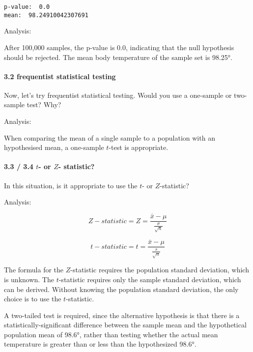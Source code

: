 \documentclass[11pt]{article}
\begin{document}
    \begin{Verbatim}[commandchars=\\\{\}]
p-value:  0.0
mean:  98.24910042307691

    \end{Verbatim}

    Analysis:

After 100,000 samples, the p-value is 0.0, indicating that the null
hypothesis should be rejected. The mean body temperature of the sample
set is 98.25°.

    \paragraph{3.2 frequentist statistical
testing}\label{frequentist-statistical-testing}

Now, let's try frequentist statistical testing. Would you use a
one-sample or two-sample test? Why?

    Analysis:

When comparing the mean of a single sample to a population with an
hypothesised mean, a one-sample \(t\)-test is appropriate.

    \paragraph{\texorpdfstring{3.3 / 3.4 \(t\)- or \(Z\)-
statistic?}{3.3 / 3.4 t- or Z- statistic?}}\label{t--or-z--statistic}

    In this situation, is it appropriate to use the \(t\)- or
\(Z\)-statistic?

    Analysis:

\[Z-statistic = Z = \frac{\bar x - \mu}{\frac{\sigma}{\sqrt n}}\]

\[t-statistic = t = \frac{\bar x - \mu}{\frac{s}{\sqrt n}}\]

The formula for the \(Z\)-statistic requires the population standard
deviation, which is unknown. The \(t\)-statistic requires only the
sample standard deviation, which can be derived. Without knowing the
population standard deviation, the only choice is to use the
\(t\)-statistic.

A two-tailed test is required, since the alternative hypothesis is that
there is a statistically-significant difference between the sample mean
and the hypothetical population mean of 98.6°, rather than testing
whether the actual mean temperature is greater than or less than the
hypothesized 98.6°.
\end{document}
